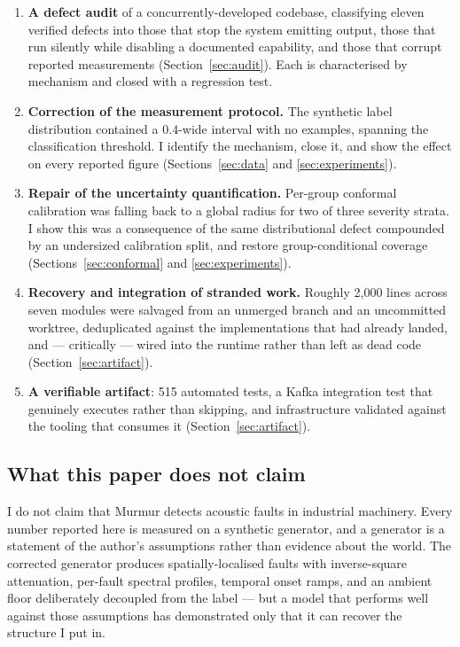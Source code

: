 \documentclass[11pt]{article}
\begin{document}
\begin{enumerate}
\item \textbf{A defect audit} of a concurrently-developed codebase, classifying
eleven verified defects into those that stop the system emitting output, those
that run silently while disabling a documented capability, and those that
corrupt reported measurements (Section~\ref{sec:audit}). Each is characterised
by mechanism and closed with a regression test.

\item \textbf{Correction of the measurement protocol.} The synthetic label
distribution contained a $0.4$-wide interval with no examples, spanning the
classification threshold. I identify the mechanism, close it, and show the
effect on every reported figure (Sections~\ref{sec:data} and \ref{sec:experiments}).

\item \textbf{Repair of the uncertainty quantification.} Per-group conformal
calibration was falling back to a global radius for two of three severity
strata. I show this was a consequence of the same distributional defect
compounded by an undersized calibration split, and restore group-conditional
coverage (Sections~\ref{sec:conformal} and \ref{sec:experiments}).

\item \textbf{Recovery and integration of stranded work.} Roughly 2{,}000 lines
across seven modules were salvaged from an unmerged branch and an uncommitted
worktree, deduplicated against the implementations that had already landed, and
--- critically --- wired into the runtime rather than left as dead code
(Section~\ref{sec:artifact}).

\item \textbf{A verifiable artifact}: 515 automated tests, a Kafka integration
test that genuinely executes rather than skipping, and infrastructure validated
against the tooling that consumes it (Section~\ref{sec:artifact}).
\end{enumerate}

\subsection{What this paper does not claim}
\label{sec:notclaim}

I do not claim that Murmur detects acoustic faults in industrial machinery.
Every number reported here is measured on a synthetic generator, and a
generator is a statement of the author's assumptions rather than evidence about
the world. The corrected generator produces spatially-localised faults with
inverse-square attenuation, per-fault spectral profiles, temporal onset ramps,
and an ambient floor deliberately decoupled from the label --- but a model that
performs well against those assumptions has demonstrated only that it can
recover the structure I put in.
\end{document}

